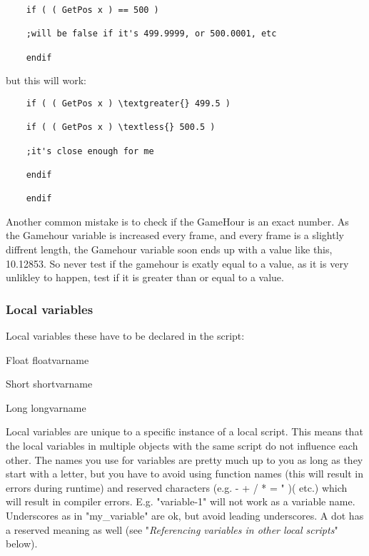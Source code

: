 \begin{lstlisting}
	if ( ( GetPos x ) == 500 )
	
	;will be false if it's 499.9999, or 500.0001, etc
	
	endif
\end{lstlisting}
	
but this will work:

\begin{lstlisting}	
	if ( ( GetPos x ) \textgreater{} 499.5 )
	
	if ( ( GetPos x ) \textless{} 500.5 )
	
	;it's close enough for me
	
	endif
	
	endif
\end{lstlisting}

\protect\hypertarget{_Toc182634499}{}{}

Another common mistake is to check if the GameHour is an exact number.
As the Gamehour variable is increased every frame, and every frame is a
slightly diffrent length, the Gamehour variable soon ends up with a
value like this, 10.12853. So never test if the gamehour is exatly equal
to a value, as it is very unlikley to happen, test if it is greater than
or equal to a value.

\hypertarget{local-variables}{%
\subsubsection{Local variables}\label{local-variables}}

Local variables these have to be declared in the script:

	Float floatvarname
	
	Short shortvarname
	
	Long longvarname

Local variables are unique to a specific instance of a local script.
This means that the local variables in multiple objects with the same
script do not influence each other. The names you use for variables are
pretty much up to you as long as they start with a letter, but you have
to avoid using function names (this will result in errors during
runtime) and reserved characters (e.g. - + / * = " )( etc.) which will
result in compiler errors. E.g. "variable-1" will not work as a variable
name. Underscores as in "my\_variable" are ok, but avoid leading
underscores. A dot has a reserved meaning as well (see
"\emph{Referencing variables in other local scripts}" below).

